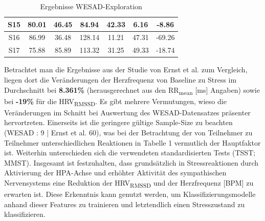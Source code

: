 \begin{table}[hp]
\begin{tabular}{ccccccc}
    \multicolumn{1}{|c|}{S15}                                                         & \multicolumn{1}{c|}{80.01}                                      & \multicolumn{1}{c|}{46.45}                                   & \multicolumn{1}{c|}{84.94}                                    & \multicolumn{1}{c|}{42.33}                                    & \multicolumn{1}{c|}{6.16}                                     & \multicolumn{1}{c|}{-8.86}                                     \\ \hline
    \multicolumn{1}{|c|}{S16}                                                         & \multicolumn{1}{c|}{86.99}                                      & \multicolumn{1}{c|}{36.48}                                   & \multicolumn{1}{c|}{128.14}                                   & \multicolumn{1}{c|}{11.21}                                    & \multicolumn{1}{c|}{47.31}                                    & \multicolumn{1}{c|}{-69.26}                                    \\ \hline
    \multicolumn{1}{|c|}{S17}                                                         & \multicolumn{1}{c|}{75.88}                                      & \multicolumn{1}{c|}{85.89}                                   & \multicolumn{1}{c|}{113.32}                                   & \multicolumn{1}{c|}{31.25}                                    & \multicolumn{1}{c|}{49.33}                                    & \multicolumn{1}{c|}{-18.74}                                    \\ \hline
\end{tabular}
\caption{Ergebnisse WESAD-Exploration}
\label{tab:wesad_werte}
\end{table}

Betrachtet man die Ergebnisse aus der Studie von Ernst et al. \cite{Ernst2023} zum Vergleich, liegen dort die Veränderungen der Herzfrequenz von Baseline zu Stress im Durchschnitt bei \textbf{8.361\%} (herausgerechnet aus den RR\textsubscript{mean} [ms] Angaben) sowie bei \textbf{-19\%} für die HRV\textsubscript{RMSSD}. Es gibt mehrere Vermutungen, wieso die Veränderungen im Schnitt bei Auswertung des WESAD-Datensatzes präsenter hervortreten. Einerseits ist die geringere gültige Sample-Size zu beachten (WESAD : 9 | Ernst et al. 60), was bei der Betrachtung der von Teilnehmer zu Teilnehmer unterschiedlichen Reaktionen in Tabelle 1 vermutlich der Hauptfaktor ist. Weiterhin unterschieden sich die verwendeten standardisierten Tests (\ac{TSST}; \ac{MMST}). Insgesamt ist festzuhalten, dass grundsätzlich in Stressreaktionen durch Aktivierung der \ac{HPA-Achse} und erhöhter Aktivität des sympathischen Nervensystems eine Reduktion der HRV\textsubscript{RMSSD} und der Herzfrequenz [BPM] zu erwarten ist. Diese Erkenntnis kann genutzt werden, um Klassifizierungsmodelle anhand dieser Features zu trainieren und letztendlich einen Stresszustand zu klassifizieren.

